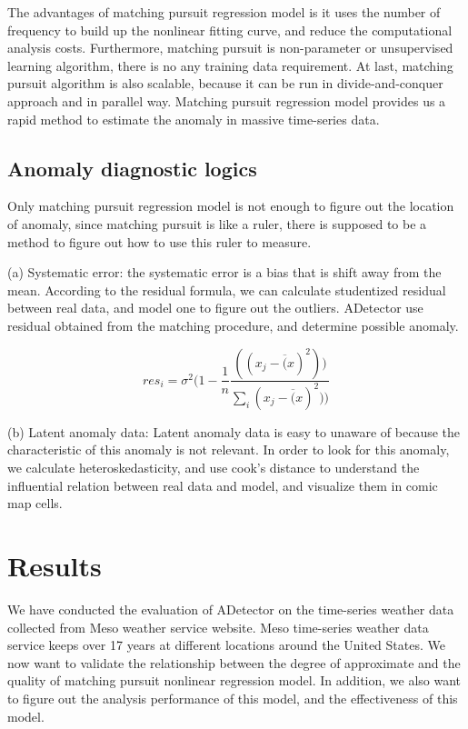 \documentclass{vgtc}                          %
\begin{document}
The advantages of matching pursuit regression model is it uses the number of frequency to build up the nonlinear fitting curve, and reduce the computational analysis costs. Furthermore, matching pursuit is non-parameter or unsupervised learning algorithm, there is no any training data requirement. At last, matching pursuit algorithm is also scalable, because it can be run in divide-and-conquer approach and in parallel way. Matching pursuit regression model provides us a rapid method to estimate the anomaly in massive time-series data. 

\subsection{Anomaly diagnostic logics}
Only matching pursuit regression model is not enough to figure out the location of anomaly, since matching pursuit is like a ruler, there is supposed to be a method to figure out how to use this ruler to measure.
	
(a) Systematic error: the systematic error is a bias that is shift away from the mean. According to the residual formula, we can calculate studentized residual between real data, and model one to figure out the outliers. ADetector use residual obtained from the matching procedure, and determine possible anomaly.
			
\begin{equation}
res_i = \sigma^2 ( 1 -\frac{1}{n} \frac{((x_j - \overline(x)^2))}{\sum_i(x_j - \overline(x)^2))}
\end{equation}		 

(b) Latent anomaly data: Latent anomaly data is easy to unaware of because the characteristic of this anomaly is not relevant. In order to look for this anomaly, we calculate heteroskedasticity, and use cook's distance to understand the influential relation between real data and model, and visualize them in comic map cells. 

\section{Results}

We have conducted the evaluation of ADetector on the time-series weather data collected from Meso weather service website. Meso time-series weather data service keeps over 17 years at different locations around the United States. We now want to validate the relationship between the degree of approximate and the quality of matching pursuit nonlinear regression model. In addition, we also want to figure out the analysis performance of this model, and the effectiveness of this model.
\end{document}
